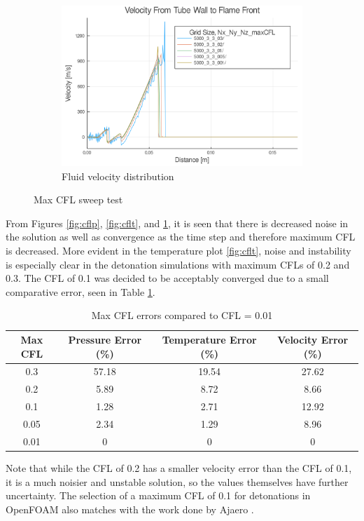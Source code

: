 \begin{figure}\ContinuedFloat
    \begin{subfigure}[]{\textwidth}
    \centering
    \includegraphics[width=\linewidth]{figs/cfl_test/u.png}
    \caption{Fluid velocity distribution}
    \label{fig:cflu}
    \end{subfigure}
    \caption{Max CFL sweep test}
    \label{fig:maxcfl}
\end{figure}



From Figures \ref{fig:cflp}, \ref{fig:cflt}, and \ref{fig:cflu}, it is seen that there is decreased noise in the solution as well as convergence as the time step and therefore maximum CFL is decreased. More evident in the temperature plot \ref{fig:cflt}, noise and instability is especially clear in the detonation simulations with maximum CFLs of 0.2 and 0.3. The CFL of 0.1 was decided to be acceptably converged due to a small comparative error, seen in Table \ref{tab:cflerror}. 
\begin{table}[b!]
\centering
\caption{Max CFL errors compared to CFL = 0.01}
\label{tab:cflerror}
\begin{tabular}{cccc}
Max CFL & Pressure Error (\%) & Temperature Error (\%) & Velocity Error (\%) \\ \hline
0.3 & 57.18 & 19.54 & 27.62 \\ 
0.2 & 5.89 & 8.72 & 8.66 \\
0.1 & 1.28 & 2.71 & 12.92 \\
0.05 & 2.34 & 1.29 & 8.96 \\
0.01 & 0 & 0 & 0 \\
\end{tabular}
\end{table}%
\noindent Note that while the CFL of 0.2 has a smaller velocity error than the CFL of 0.1, it is a much noisier and unstable solution, so the values themselves have further uncertainty. The selection of a maximum CFL of 0.1  for detonations in OpenFOAM also matches with the work done by Ajaero \cite{ajaero}. 

